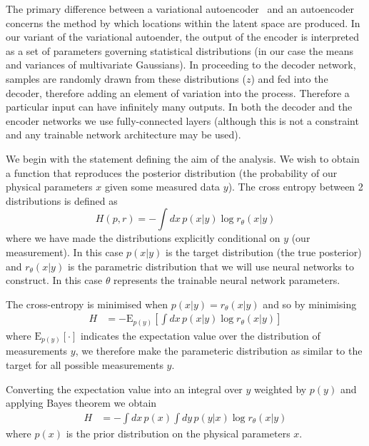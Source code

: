 \documentclass[%
showpacs,
 amsmath,amssymb,
 aps,
 twocolumn,
 prl,
 reprint,
floatfix,
]{revtex4-1}
\begin{document}
%
%
The primary difference between a variational autoencoder~\cite{1812.04405} and
an autoencoder concerns the method by which locations within the latent space
are produced. In our variant of the variational autoender, the output of the
encoder is interpreted as a set of parameters governing statistical
distributions (in our case the means and variances of multivariate Gaussians).
In proceeding to the decoder network, samples are randomly drawn from these
distributions ($z$) and fed into the decoder, therefore adding an element of
variation into the process. Therefore a particular input can have infinitely
many outputs. In both the decoder and the encoder networks we use
fully-connected layers (although this is not a constraint and any trainable
network architecture may be used).

%
%
We begin with the statement defining the aim of the analysis. We wish to obtain
a function that reproduces the posterior distribution (the probability of our
physical parameters $x$ given some measured data $y$). The cross entropy
between 2 distributions is defined as
%
\begin{equation}\label{eq:cross_ent}
H(p,r) = -\int dx\, p(x|y) \log r_{\theta}(x|y)
\end{equation}
%
where we have made the distributions explicitly conditional on $y$ (our
measurement). In this case $p(x|y)$ is the target distribution (the true
posterior) and $r_{\theta}(x|y)$ is the parametric distribution that we will
use neural networks to construct. In this case $\theta$ represents the
trainable neural network parameters. 

The cross-entropy is minimised when $p(x|y)=r_{\theta}(x|y)$ and so by
minimising
%
\begin{align}\label{eq:cost1}
H &= -\text{E}_{p(y)}\left[\int dx\,p(x|y) \log r_{\theta}(x|y)\right]
\end{align}
% 
where $\text{E}_{p(y)}[\cdot]$ indicates the expectation value over the
distribution of measurements $y$, we therefore make the parameteric distribution
as similar to the target for all possible measurements $y$.

Converting the expectation value into an integral over $y$ weighted by $p(y)$
and applying Bayes theorem we obtain
%
\begin{align}\label{eq:cost1}
H &= -\int dx\,p(x)\int dy\,p(y|x)\log r_{\theta}(x|y)
\end{align}
%
where $p(x)$ is the prior distribution on the physical parameters $x$.
\end{document}
